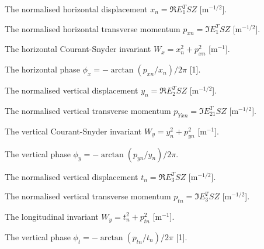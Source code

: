 \begin{mylist}
The normalised horizontal displacement
\(x_{n}=\Re E_1^T S Z\) [\(\mathrm{m}^{-1/2}\)].
 
The normalised horizontal transverse momentum
\(p_{xn}=\Im E_1^T S Z\) [\(\mathrm{m}^{-1/2}\)].
 
The horizontal Courant-Snyder invariant
\(W_{x}=x_{n}^{2}+p_{xn}^{2}\) [\(\mathrm{m}^{-1}\)].
 
The horizontal phase
\(\phi_{x}=-\arctan(p_{xn}/x_{n}) / 2\pi\) [1].
 
The normalised vertical displacement
\(y_{n}=\Re E_2^T S Z\) [\(\mathrm{m}^{-1/2}\)].
 
The normalised vertical transverse momentum
\(p_{Yxn}=\Im E_21^T S Z\) [\(\mathrm{m}^{-1/2}\)].
 
The vertical Courant-Snyder invariant
\(W_{y}=y_{n}^{2}+p_{yn}^{2}\) [\(\mathrm{m}^{-1}\)].
 
The vertical phase
\(\phi_{y}=-\arctan(p_{yn}/y_{n}) / 2\pi\).
 
The normalised vertical displacement
\(t_{n}=\Re E_3^T S Z\) [\(\mathrm{m}^{-1/2}\)].
 
The normalised vertical transverse momentum
\(p_{tn}=\Im E_3^T S Z\) [\(\mathrm{m}^{-1/2}\)].
 
The longitudinal invariant
\(W_{y}=t_n^2 + p_{tn}^2\) [\(\mathrm{m}^{-1}\)].
 
The vertical phase
\(\phi_{t}=-\arctan(p_{tn}/t_{n}) / 2\pi\) [1].
\end{mylist}
 
